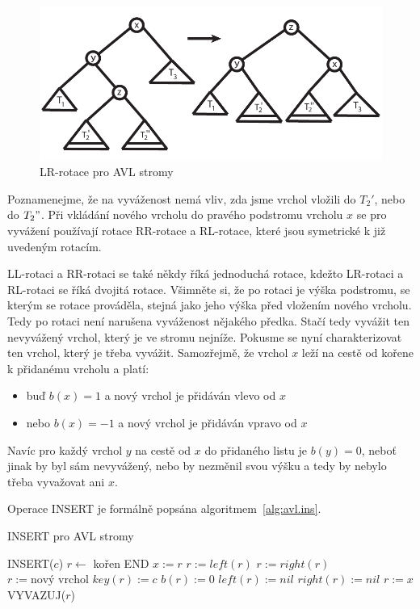 \begin{figure}[!htb]
\centering\includegraphics{pics/avl-lr}
\caption{LR-rotace pro AVL stromy}
\label{avl-lr}
\end{figure}

Poznamenejme, že na vyváženost nemá vliv, zda jsme vrchol vložili do
$T_{2}'$,
nebo do $T_{2}"$. Při vkládání nového vrcholu do pravého podstromu vrcholu
$x$ se pro vyvážení používají rotace RR-rotace a RL-rotace, které jsou 
symetrické k již uvedeným rotacím.

\begin{samepage}
LL-rotaci a RR-rotaci se také někdy říká jednoduchá rotace, kdežto
LR-rotaci a RL-rotaci se říká dvojitá rotace. Všimněte si, že po rotaci je
výška podstromu, se kterým se rotace prováděla, stejná jako jeho výška
před vložením nového vrcholu. Tedy po rotaci není narušena vyváženost
nějakého předka. Stačí tedy vyvážit ten nevyvážený vrchol, který je ve
stromu nejníže. Pokusme se nyní charakterizovat ten vrchol, který je třeba
vyvážit. Samozřejmě, že vrchol $x$ leží na cestě od kořene k přidanému
vrcholu a platí:
\begin{itemize}
\item buď $b(x)=1$ a nový vrchol je přidáván vlevo od $x$
\item nebo $b(x)=-1$ a nový vrchol je přidáván vpravo od $x$
\end{itemize}
\end{samepage}

Navíc pro každý vrchol $y$ na cestě od $x$ do přidaného listu je $b(y)=0$,
neboť jinak by byl sám nevyvážený, nebo by nezměnil svou výšku a tedy 
by nebylo třeba vyvažovat ani $x$.

Operace INSERT je formálně popsána algoritmem~\ref{alg:avl.ins}.

\begin{algorithm}[!htb]
\caption{INSERT pro AVL stromy}
\label{alg:avl.ins}
\begin{algorithmic}
\STATE INSERT($c$)
\STATE $r \leftarrow$ kořen
  \STATE END
\ENDIF
{}
   \STATE $x := r$
\ENDIF
{}
  \STATE $r := left(r)$
\ELSE
  \STATE $r := right(r)$
\ENDIF
\ENDWHILE
\STATE {}
\STATE $r := \text{nový vrchol}$
\STATE $key(r):=c$
\STATE $b(r):=0$
\STATE $left(r):=nil$
\STATE $right(r):=nil$
\STATE $r:=x$
\STATE VYVAZUJ($r$)
\end{algorithmic}
\end{algorithm}


